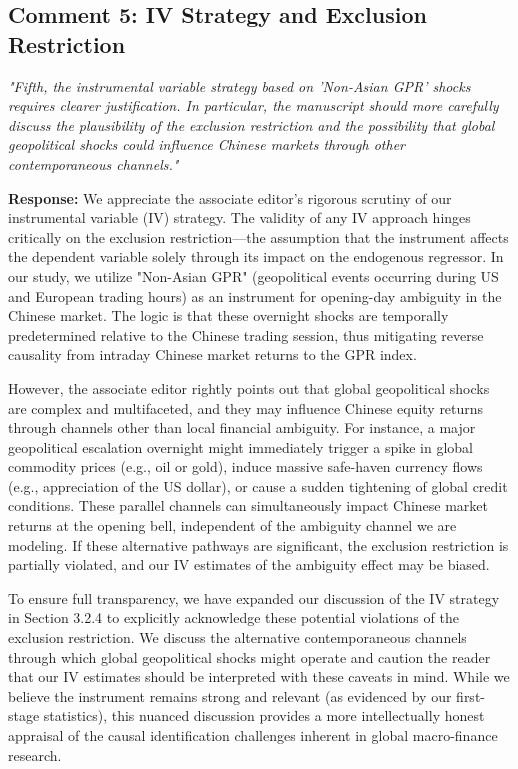 \documentclass[12pt]{article}
\begin{document}
\subsection*{Comment 5: IV Strategy and Exclusion Restriction}
\textit{"Fifth, the instrumental variable strategy based on 'Non-Asian GPR' shocks requires clearer justification. In particular, the manuscript should more carefully discuss the plausibility of the exclusion restriction and the possibility that global geopolitical shocks could influence Chinese markets through other contemporaneous channels."}

\begin{highlightbox}
\textbf{Response:} We appreciate the associate editor's rigorous scrutiny of our instrumental variable (IV) strategy. The validity of any IV approach hinges critically on the exclusion restriction—the assumption that the instrument affects the dependent variable solely through its impact on the endogenous regressor. In our study, we utilize "Non-Asian GPR" (geopolitical events occurring during US and European trading hours) as an instrument for opening-day ambiguity in the Chinese market. The logic is that these overnight shocks are temporally predetermined relative to the Chinese trading session, thus mitigating reverse causality from intraday Chinese market returns to the GPR index.

However, the associate editor rightly points out that global geopolitical shocks are complex and multifaceted, and they may influence Chinese equity returns through channels other than local financial ambiguity. For instance, a major geopolitical escalation overnight might immediately trigger a spike in global commodity prices (e.g., oil or gold), induce massive safe-haven currency flows (e.g., appreciation of the US dollar), or cause a sudden tightening of global credit conditions. These parallel channels can simultaneously impact Chinese market returns at the opening bell, independent of the ambiguity channel we are modeling. If these alternative pathways are significant, the exclusion restriction is partially violated, and our IV estimates of the ambiguity effect may be biased.

To ensure full transparency, we have expanded our discussion of the IV strategy in Section 3.2.4 to explicitly acknowledge these potential violations of the exclusion restriction. We discuss the alternative contemporaneous channels through which global geopolitical shocks might operate and caution the reader that our IV estimates should be interpreted with these caveats in mind. While we believe the instrument remains strong and relevant (as evidenced by our first-stage statistics), this nuanced discussion provides a more intellectually honest appraisal of the causal identification challenges inherent in global macro-finance research.
\end{highlightbox}
\end{document}
